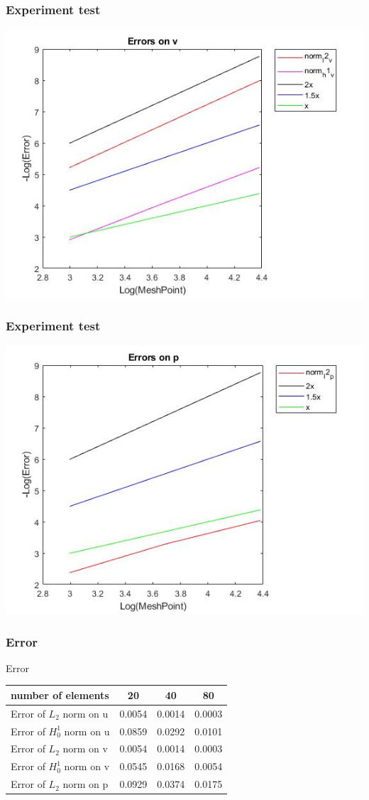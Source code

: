\documentclass[11pt]{beamer}
\numberwithin{equation}{section}
\theoremstyle{plain}
\theoremstyle{definition}
\theoremstyle{remark}
\begin{document}
\begin{frame}\frametitle{Experiment test}
\includegraphics[scale=0.5]{4}
\end{frame}
\begin{frame}\frametitle{Experiment test}
\includegraphics[scale=0.5]{5}
\end{frame}
\begin{frame}\frametitle{Error}
\begin{block}{Error}
\begin{tabular}{|l||c||c||c|}
\hline 
number of elements  & 20 & 40 & 80  \\ 
\hline 
Error of $L_2$ norm on u  & 0.0054  &0.0014 & 0.0003  \\
\hline
Error of $H_0^1$ norm on u  & 0.0859 & 0.0292 & 0.0101  \\
\hline
Error of $L_2$ norm on v  & 0.0054  &0.0014 & 0.0003  \\
\hline
Error of $H_0^1$ norm on v  & 0.0545 & 0.0168 & 0.0054  \\
\hline
Error of $L_2$ norm on p  & 0.0929  &0.0374 & 0.0175  \\
\hline
\end{tabular}
\end{block}
\end{frame}
\end{document}

